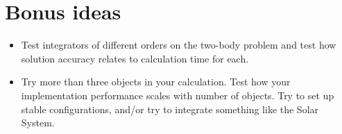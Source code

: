 \documentclass[11pt, preprint]{aastex}
\begin{document}
\section{Bonus ideas}

\begin{itemize}
\item Test integrators of different orders on the two-body problem and
  test how solution accuracy relates to calculation time for each.
\item Try more than three objects in your calculation. Test how your
  implementation performance scales with number of objects. Try to set
  up stable configurations, and/or try to integrate something like the
  Solar System.
\end{itemize}
\end{document}
